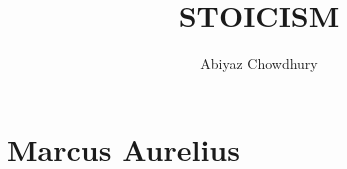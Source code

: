 \documentclass[12pt]{article}
\begin{document}
		\title{\textbf{STOICISM}}
	\author{Abiyaz Chowdhury}
	\maketitle
	\section{Marcus Aurelius}
	\begin{enumerate}

	\end{enumerate}

	
\end{document}
